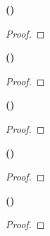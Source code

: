 \documentclass[12pt]{article}
\begin{document}
\pagestyle{fancy}
\setlength{\headheight}{14.49998pt}
\fancyfoot[C]{\thepage}

\noindent \textbf{()}

\begin{proof}
	\lipsum[1]
\end{proof}

\newpage

\noindent \textbf{()}

\begin{proof}
	\lipsum[1]
\end{proof}

\newpage

\noindent \textbf{()}

\begin{proof}
	\lipsum[1]
\end{proof}

\newpage

\noindent \textbf{()}

\begin{proof}
	\lipsum[1]
\end{proof}

\newpage

\noindent \textbf{()}

\begin{proof}
	\lipsum[1]
\end{proof}
\end{document}

